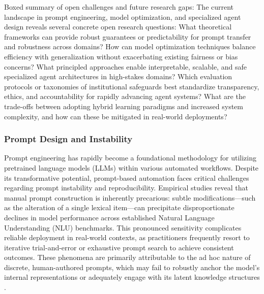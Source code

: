 \documentclass[sigconf]{acmart}
\begin{document}
Boxed summary of open challenges and future research gaps:
The current landscape in prompt engineering, model optimization, and specialized agent design reveals several concrete open research questions:
What theoretical frameworks can provide robust guarantees or predictability for prompt transfer and robustness across domains?
How can model optimization techniques balance efficiency with generalization without exacerbating existing fairness or bias concerns?
What principled approaches enable interpretable, scalable, and safe specialized agent architectures in high-stakes domains?
Which evaluation protocols or taxonomies of institutional safeguards best standardize transparency, ethics, and accountability for rapidly advancing agent systems?
What are the trade-offs between adopting hybrid learning paradigms and increased system complexity, and how can these be mitigated in real-world deployments?

\subsubsection{Prompt Design and Instability}

Prompt engineering has rapidly become a foundational methodology for utilizing pretrained language models (LLMs) within various automated workflows. Despite its transformative potential, prompt-based automation faces critical challenges regarding prompt instability and reproducibility. Empirical studies reveal that manual prompt construction is inherently precarious: subtle modifications---such as the alteration of a single lexical item---can precipitate disproportionate declines in model performance across established Natural Language Understanding (NLU) benchmarks. This pronounced sensitivity complicates reliable deployment in real-world contexts, as practitioners frequently resort to iterative trial-and-error or exhaustive prompt search to achieve consistent outcomes. These phenomena are primarily attributable to the ad hoc nature of discrete, human-authored prompts, which may fail to robustly anchor the model’s internal representations or adequately engage with its latent knowledge structures \cite{ref103}.
\end{document}

